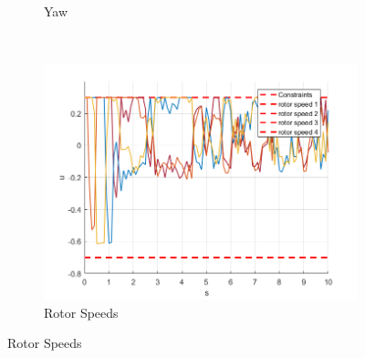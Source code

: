 \documentclass[11pt]{article}
\begin{document}
\begin{enumerate}
\begin{figure}[ht]
\begin{subfigure}[c]{0.3\linewidth}
            \caption{Yaw}
        \end{subfigure}
        ~
        \begin{subfigure}[c]{0.3\linewidth}
            \centering
            \includegraphics[width=\linewidth]{Plots_09_OffsetFreeTracking_Constant/03}
            \caption{Rotor Speeds}
        \end{subfigure}


\end{figure}
\end{enumerate}
\end{document}
